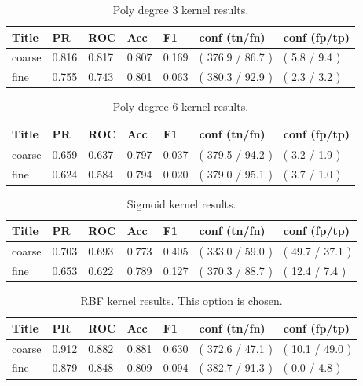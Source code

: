 \documentclass[ms]{nuthesis}
\begin{document}
\FloatBarrier
\begin{table}[H]
\centering
\caption{Poly degree 3 kernel results.}
\label{tab:polyDeg3}
\begin{tabular}{|l||l||l||l||l||l||l|}\toprule
Title & PR & ROC & Acc & F1 & conf (tn/fn) & conf (fp/tp) \\ \midrule
coarse & 0.816 & 0.817 & 0.807 & 0.169 & ( 376.9 / 86.7 ) & ( 5.8 / 9.4 ) \\
fine & 0.755 & 0.743 & 0.801 & 0.063 & ( 380.3 / 92.9 ) & ( 2.3 / 3.2 ) \\ \bottomrule
\end{tabular}
\end{table}
\FloatBarrier

\FloatBarrier
\begin{table}[H]
\centering
\caption{Poly degree 6 kernel results.}
\label{tab:polyDeg6}
\begin{tabular}{|l||l||l||l||l||l||l|}\toprule
Title & PR & ROC & Acc & F1 & conf (tn/fn) & conf (fp/tp) \\ \midrule
coarse & 0.659 & 0.637 & 0.797 & 0.037 & ( 379.5 / 94.2 ) & ( 3.2 / 1.9 ) \\
fine & 0.624 & 0.584 & 0.794 & 0.020 & ( 379.0 / 95.1 ) & ( 3.7 / 1.0 ) \\ \bottomrule
\end{tabular}
\end{table}
\FloatBarrier

\FloatBarrier
\begin{table}[H]
\centering
\caption{Sigmoid kernel results.}
\label{tab:sigmoid}
\begin{tabular}{|l||l||l||l||l||l||l|}\toprule
Title & PR & ROC & Acc & F1 & conf (tn/fn) & conf (fp/tp) \\ \midrule
coarse & 0.703 & 0.693 & 0.773 & 0.405 & ( 333.0 / 59.0 ) & ( 49.7 / 37.1 ) \\
fine & 0.653 & 0.622 & 0.789 & 0.127 & ( 370.3 / 88.7 ) & ( 12.4 / 7.4 ) \\ \bottomrule
\end{tabular}
\end{table}
\FloatBarrier

\FloatBarrier
\begin{table}[H]
\centering
\caption{RBF kernel results. This option is chosen.}
\label{tab:RbfOrig}
\begin{tabular}{|l||l||l||l||l||l||l|}\toprule
Title & PR & ROC & Acc & F1 & conf (tn/fn) & conf (fp/tp) \\ \midrule
coarse & 0.912 & 0.882 & 0.881 & 0.630 & ( 372.6 / 47.1 ) & ( 10.1 / 49.0 ) \\
fine & 0.879 & 0.848 & 0.809 & 0.094 & ( 382.7 / 91.3 ) & ( 0.0 / 4.8 ) \\ \bottomrule
\end{tabular}
\end{table}
\FloatBarrier
\end{document}
